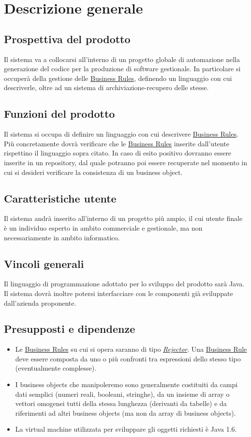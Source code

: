 \chapter{Descrizione generale}
\section{Prospettiva del prodotto}
Il sistema va a collocarsi all'interno di un progetto globale di automazione nella generazione del codice per la produzione di software gestionale. In particolare si occuper\`a della gestione delle \underline{Business Rules}, definendo un linguaggio con cui descriverle, oltre ad un sistema di archiviazione-recupero delle stesse.
\section{Funzioni del prodotto}
Il sistema si occupa di definire un linguaggio con cui descrivere \underline{Business Rules}. Pi\`u concretamente dovr\`a verificare che le \underline{Business Rules} inserite dall'utente rispettino il linguaggio sopra citato. In caso di esito positivo dovranno essere inserite in un repository, dal quale potranno poi essere recuperate nel momento in cui si desideri verificare la consistenza di un business object.
\section{Caratteristiche utente}
Il sistema andr\`a inserito all'interno di un progetto pi\`u ampio, il cui utente finale \`e un individuo esperto in ambito commerciale e gestionale, ma non necessariamente in ambito informatico.
\section{Vincoli generali}
Il linguaggio di programmazione adottato per lo sviluppo del prodotto sar\`a Java. Il sistema dovr\`a inoltre potersi interfacciare con le componenti gi\`a sviluppate dall'azienda proponente. 
\section{Presupposti e dipendenze}
\begin{itemize}
\item{Le \underline{Business Rules} su cui si opera saranno di tipo \textit{\underline{Rejector}}. Una \underline{Business Rule} deve essere composta da uno o pi\`u confronti tra espressioni dello stesso tipo (eventualmente complesse).}
\item{I business objects che manipoleremo sono generalmente costituiti da campi dati semplici (numeri reali, booleani, stringhe), da un insieme di array o vettori omogenei tutti della stessa lunghezza (derivanti da tabelle) e da riferimenti ad altri business objects (ma non da array di business objects).
}
\item{La virtual machine utilizzata  per sviluppare gli oggetti richiesti \`e Java 1.6.}
\end{itemize}

